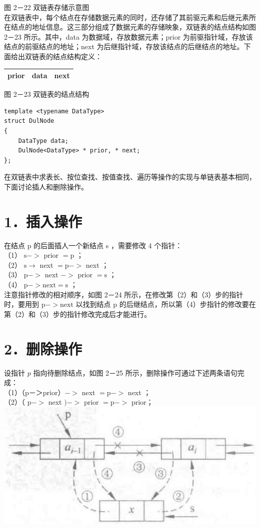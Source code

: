 \documentclass[10pt]{article}
\begin{document}
图 2－22 双链表存储示意图\\
在双链表中，每个结点在存储数据元素的同时，还存储了其前驱元素和后继元素所在结点的地址信息。这三部分组成了数据元素的存储映象，双链表的结点结构如图 2－23 所示。其中，data 为数据域，存放数据元素；prior 为前驱指针域，存放该结点的前驱结点的地址；next 为后继指针域，存放该结点的后继结点的地址。下面给出双链表的结点结构定义：

\begin{center}
\begin{tabular}{|c|c|c|}
\hline
prior & data & next \\
\hline
\end{tabular}
\end{center}

图 2－23 双链表的结点结构

\begin{verbatim}
template <typename DataType>
struct DulNode
{
    DataType data;
    DulNode<DataType> * prior, * next;
};
\end{verbatim}

在双链表中求表长、按位查找、按值查找、遍历等操作的实现与单链表基本相同，下面讨论插人和删除操作。

\section*{1．插入操作}
在结点 p 的后面插人一个新结点 s ，需要修改 4 个指针：\\
（1） $\mathrm{s}->$ prior $=\mathrm{p}$ ；\\
（2） $\mathrm{s} \longrightarrow$ next $=\mathrm{p}->$ next ；\\
（3） $\mathrm{p}->$ next $->$ prior $=\mathrm{s}$ ；\\
（4） $\mathrm{p}->\mathrm{next}=\mathrm{s}$ ；\\
注意指针修改的相对顺序，如图 2－24 所示，在修改第（2）和（3）步的指针时，要用到 $\mathrm{p}->\mathrm{next}$ 以找到结点 p 的后继结点，所以第（4）步指针的修改要在第（2）和（3）步的指针修改完成后才能进行。

\section*{2．删除操作}
设指针 $p$ 指向待删除结点，如图 2－25 所示，删除操作可通过下述两条语句完成：\\
（1）（p－＞prior）$->$ next $=\mathrm{p}->$ next ；\\
（2）（ $\mathrm{p}->$ next $)->$ prior $=\mathrm{p}->$ prior；\\
\includegraphics[max width=\textwidth, center]{2025_06_06_704745ea57b15b2333e5g-063(1)}
\end{document}
